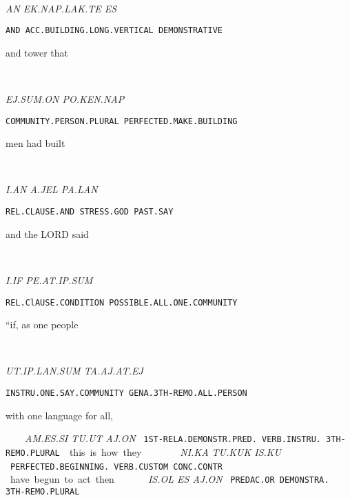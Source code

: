 {\drie 
  
\an~\ek\nap\lak\te ~\es

{\it AN	EK.NAP.LAK.TE			ES			 }

{\tt AND	ACC.BUILDING.LONG.VERTICAL	DEMONSTRATIVE	 }

and 	tower 				that 			 

\drie 

\ej\Atlansum\on ~ \po\ken\nap

{\it EJ.SUM.ON			PO.KEN.NAP }

{\tt COMMUNITY.PERSON.PLURAL	PERFECTED.MAKE.BUILDING }

men				had built 

  
\drie 

\Atlani\an ~ \Atlana\jel~\pa\lan

{\it I.AN			A.JEL		PA.LAN }

{\tt REL.CLAUSE.AND              STRESS.GOD	PAST.SAY }

and 			the LORD            said 

\drie 

\Atlani\Atlanif~\pe\at\ip\Atlansum

{\it I.IF			PE.AT.IP.SUM				 }

{\tt REL.ClAUSE.CONDITION	POSSIBLE.ALL.ONE.COMMUNITY		 }

“if, 			as one people 		
\drie 


\ut\ip\lan\Atlansum~\ta\aj\at\ej\comma

{\it UT.IP.LAN.SUM			TA.AJ.AT.EJ }

{\tt INSTRU.ONE.SAY.COMMUNITY	GENA.3TH-REMO.ALL.PERSON	 }

with one language 		for all, 
\drie 

\am\es\si~\tu\ut~\aj\on
 
{\it AM.ES.SI			TU.UT		AJ.ON }

{\tt 1ST-RELA.DEMONSTR.PRED.	VERB.INSTRU.    3TH-REMO.PLURAL }

this is 				how       	they  
  
\drie 

\Atlanni\ka~\tu\kuk~\is\ku

{\it NI.KA				TU.KUK		IS.KU                    } 

{\tt PERFECTED.BEGINNING.                 VERB.CUSTOM	CONC.CONTR	 }

have begun 			to act		then 		 
\drie 


\is\ol~\es~\aj\on

{\it IS.OL		ES		AJ.ON	 }

{\tt PREDAC.OR	DEMONSTRA.	3TH-REMO.PLURAL }

}
